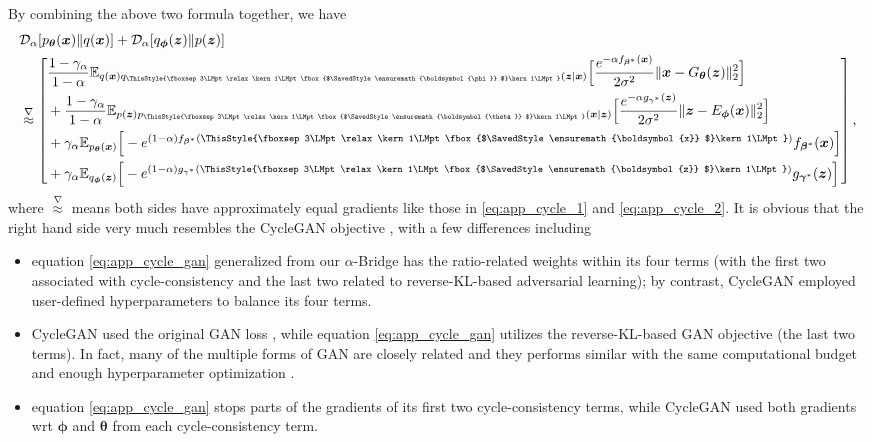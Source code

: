 \documentclass[letterpaper]{article} %
\newcommand{\beq}{\begin{equation}}
\newcommand{\eeq}{\end{equation}}
\newcommand{\bali}{\begin{aligned}}
\newcommand{\eali}{\end{aligned}}
\newcommand{\Dc}[0]{\ensuremath{\mathcal{D}} }
\newcommand{\Ebb}[0]{\ensuremath{\mathbb{E}} }
\newcommand{\xv}[0]{\ensuremath{\boldsymbol{x}} }
\newcommand{\zv}[0]{\ensuremath{\boldsymbol{z}} }
\newcommand{\betav}[0]{\ensuremath{\boldsymbol{\beta}} }
\newcommand{\gammav}[0]{\ensuremath{\boldsymbol{\gamma}} }
\newcommand{\thetav}[0]{\ensuremath{\boldsymbol{\theta}} }
\newcommand{\phiv}[0]{\ensuremath{\boldsymbol{\phi}} }
\newcommand\mathbox[1]{\mathord{\ThisStyle{%
			\fboxsep3\LMpt\relax\kern1\LMpt\fbox{$\SavedStyle#1$}\kern1\LMpt}}}
\begin{document}
By combining the above two formula together, we have 
\beq\label{eq:app_cycle_gan}
\bali
    & \Dc_{\alpha} [p_{\thetav}(\xv) \| q(\xv)] + \Dc_{\alpha} [q_{\phiv}(\zv) \| p(\zv)]
    \\
    & 
    \overset{\nabla}{\approx} 
    \left[
    \bali
        & \frac{1 - \gamma_{\alpha}}{1 - \alpha} \Ebb_{q(\xv) q_{\mathbox{\phiv}}(\zv|\xv)} \Big[ 
        \frac{e^{- \alpha f_{\betav^{*}}(\xv)}}{2\sigma^2}
        \| \xv - G_{\thetav}(\zv) \|_2^2
        \Big] 
        \\
        & + \frac{1 - \gamma_{\alpha}}{1 - \alpha} \Ebb_{p(\zv) p_{\mathbox{\thetav}}(\xv|\zv)} \Big[ 
        \frac{e^{- \alpha g_{\gamma^{*}}(\zv)}}{2\sigma^2}
        \| \zv - E_{\phiv}(\xv) \|_2^2
        \Big] 
        \\
        & + \gamma_{\alpha} \Ebb_{p_{\thetav}(\xv)} \Big[
        -e^{(1 - \alpha) f_{\betav^{*}}(\mathbox{\xv})}
        f_{\betav^{*}}(\xv)
        \Big]
        \\
        & + \gamma_{\alpha} \Ebb_{q_{\phiv}(\zv)} \Big[
        -e^{(1 - \alpha) g_{\gamma^{*}}(\mathbox{\zv})}
        g_{\gammav^{*}}(\zv)
        \Big]
    \eali
    \right],
\eali
\eeq
where $\overset{\nabla}{\approx}$ means both sides have approximately equal gradients like those in \eqref{eq:app_cycle_1} and \eqref{eq:app_cycle_2}. 
It is obvious that the right hand side very much resembles the CycleGAN objective \cite{zhu2017unpaired}, with a few differences including
\begin{itemize}

    \item equation \eqref{eq:app_cycle_gan} generalized from our $\alpha$-Bridge has the ratio-related weights within its four terms (with the first two associated with cycle-consistency and the last two related to reverse-KL-based adversarial learning); by contrast, CycleGAN employed user-defined hyperparameters to balance its four terms.

    \item CycleGAN used the original GAN loss \cite{goodfellow2016nips}, while equation \eqref{eq:app_cycle_gan} utilizes the reverse-KL-based GAN objective (the last two terms). In fact, many of the multiple forms of GAN are closely related \cite{nowozin2016f} and they performs similar with the same computational budget and enough hyperparameter optimization \cite{kurach2018gan,GoogleCompareGAN}.
    
    \item equation \eqref{eq:app_cycle_gan} stops parts of the gradients of its first two cycle-consistency terms, while CycleGAN used both gradients wrt $\phiv$ and $\thetav$ from each cycle-consistency term.
    
    
\end{itemize}
\end{document}
